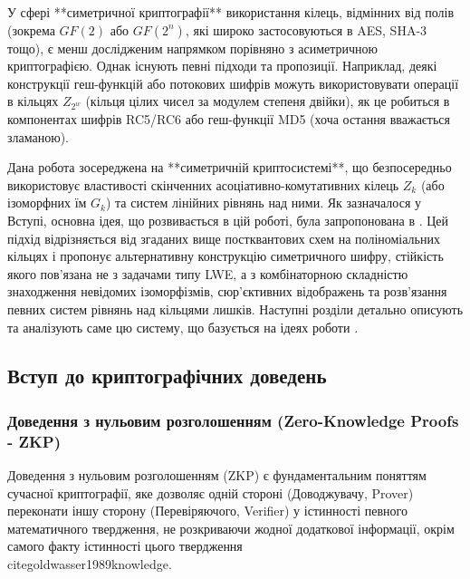 \documentclass[a4paper,12pt]{article}
\begin{document}
    У сфері **симетричної криптографії** використання кілець, відмінних від полів (зокрема \(GF(2)\) або \(GF(2^n)\), які широко застосовуються в AES, SHA-3 тощо), є менш дослідженим напрямком порівняно з асиметричною криптографією. Однак існують певні підходи та пропозиції. Наприклад, деякі конструкції геш-функцій або потокових шифрів можуть використовувати операції в кільцях \(Z_{2^w}\) (кільця цілих чисел за модулем степеня двійки), як це робиться в компонентах шифрів RC5/RC6 або геш-функції MD5 (хоча остання вважається зламаною).

    Дана робота зосереджена на **симетричній криптосистемі**, що безпосередньо використовує властивості скінченних асоціативно-комутативних кілець \(Z_k\) (або ізоморфних їм \(G_k\)) та систем лінійних рівнянь над ними. Як зазначалося у Вступі, основна ідея, що розвивається в цій роботі, була запропонована в \cite{5}. Цей підхід відрізняється від згаданих вище постквантових схем на поліноміальних кільцях і пропонує альтернативну конструкцію симетричного шифру, стійкість якого пов'язана не з задачами типу LWE, а з комбінаторною складністю знаходження невідомих ізоморфізмів, сюр'єктивних відображень та розв'язання певних систем рівнянь над кільцями лишків. Наступні розділи детально описують та аналізують саме цю систему, що базується на ідеях роботи \cite{5}.

    \subsection{Вступ до криптографічних доведень} %

    \subsubsection{Доведення з нульовим розголошенням (Zero-Knowledge Proofs - ZKP)} %
    Доведення з нульовим розголошенням (ZKP) є фундаментальним поняттям сучасної криптографії, яке дозволяє одній стороні (Доводжувачу, Prover) переконати іншу сторону (Перевіряючого, Verifier) у істинності певного математичного твердження, не розкриваючи жодної додаткової інформації, окрім самого факту істинності цього твердження \\cite{goldwasser1989knowledge}.
\end{document}
